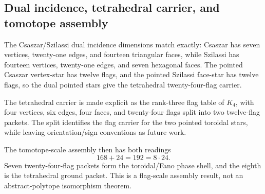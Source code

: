 \subsection{Dual incidence, tetrahedral carrier, and tomotope assembly}
\label{sec:bt1527-bt1529-dual-tetra-tomotope}

The Csaszar/Szilassi dual incidence dimensions match exactly: Csaszar has seven vertices, twenty-one edges, and fourteen triangular faces, while Szilassi has fourteen vertices, twenty-one edges, and seven hexagonal faces.  The pointed Csaszar vertex-star has twelve flags, and the pointed Szilassi face-star has twelve flags, so the dual pointed stars give the tetrahedral twenty-four-flag carrier.

The tetrahedral carrier is made explicit as the rank-three flag table of \(K_4\), with four vertices, six edges, four faces, and twenty-four flags split into two twelve-flag packets.  The split identifies the flag carrier for the two pointed toroidal stars, while leaving orientation/sign conventions as future work.

The tomotope-scale assembly then has both readings
\[
168+24=192=8\cdot24.
\]
Seven twenty-four-flag packets form the toroidal/Fano phase shell, and the eighth is the tetrahedral ground packet.  This is a flag-scale assembly result, not an abstract-polytope isomorphism theorem.
